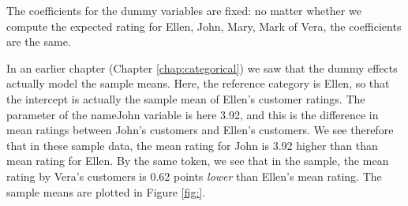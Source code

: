 The coefficients for the dummy variables are fixed: no matter whether we compute the expected rating for Ellen, John, Mary, Mark of Vera, the coefficients are the same.


\begin{kframe}


{\ttfamily\noindent\bfseries{}}

{\ttfamily\noindent\bfseries{}}

{\ttfamily\noindent\bfseries{}}

{\ttfamily\noindent\itshape\color{messagecolor}{\#\# Loading required package: Matrix}}

{\ttfamily\noindent\bfseries{}}

{\ttfamily\noindent\bfseries{}}

{\ttfamily\noindent\bfseries{}}

{\ttfamily\noindent\bfseries\color{errorcolor}{\#\# Error in tidy(random\_model): object 'random\_model' not found}}\end{kframe}

In an earlier chapter (Chapter \ref{chap:categorical}) we saw that the dummy effects actually model the sample means. Here, the reference category is Ellen, so that the intercept is actually the sample mean of Ellen's customer ratings. The parameter of the nameJohn variable is here 3.92, and this is the difference in mean ratings between John's customers and Ellen's customers. We see therefore that in these sample data, the mean rating for John is 3.92 higher than than mean rating for Ellen. By the same token, we see that in the sample, the mean rating by Vera's customers is 0.62 points \textit{lower} than Ellen's mean rating. The sample means are plotted in Figure \ref{fig:}.

